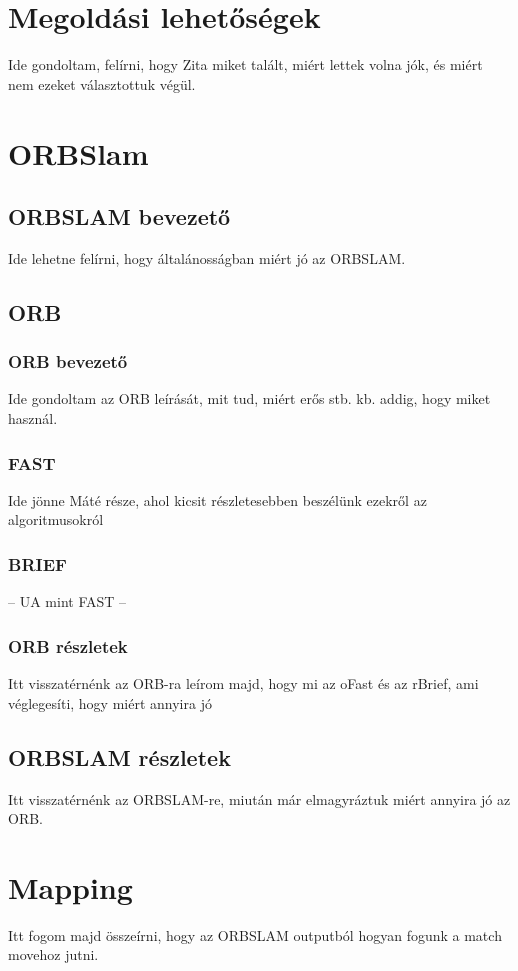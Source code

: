 \section{Megoldási lehetőségek}

Ide gondoltam, felírni, hogy Zita miket talált, miért lettek volna jók, és miért nem ezeket választottuk végül.

\section{ORBSlam}

\subsection{ORBSLAM bevezető}

Ide lehetne felírni, hogy általánosságban miért jó az ORBSLAM.

\subsection{ORB}

\subsubsection{ORB bevezető}

Ide gondoltam az ORB leírását, mit tud, miért erős stb. kb. addig, hogy miket használ.

\subsubsection{FAST}

Ide jönne Máté része, ahol kicsit részletesebben beszélünk ezekről az algoritmusokról

\subsubsection{BRIEF}

-- UA mint FAST --

\subsubsection{ORB részletek}

Itt visszatérnénk az ORB-ra leírom majd, hogy mi az oFast és az rBrief, ami véglegesíti, hogy miért annyira jó

\subsection{ORBSLAM részletek}

Itt visszatérnénk az ORBSLAM-re, miután már elmagyráztuk miért annyira jó az ORB.

\section{Mapping}

Itt fogom majd összeírni, hogy az ORBSLAM outputból hogyan fogunk a match movehoz jutni.